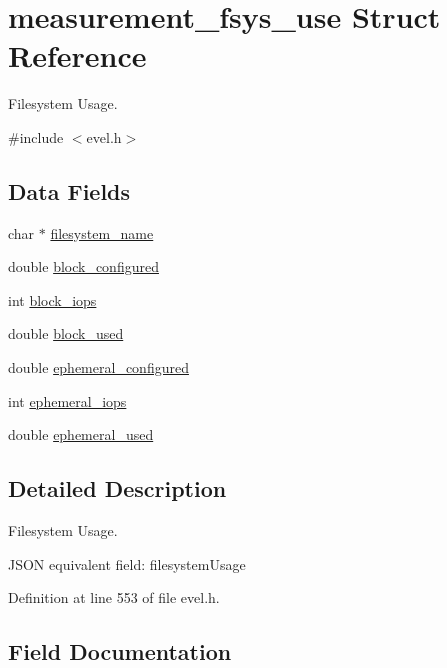 \hypertarget{structmeasurement__fsys__use}{}\section{measurement\+\_\+fsys\+\_\+use Struct Reference}
\label{structmeasurement__fsys__use}


Filesystem Usage.  




{\ttfamily \#include $<$evel.\+h$>$}

\subsection*{Data Fields}
\begin{DoxyCompactItemize}
\item 
char $\ast$ \hyperlink{structmeasurement__fsys__use_aacac02250f665f7b9b6fcf229c842c80}{filesystem\+\_\+name}
\item 
double \hyperlink{structmeasurement__fsys__use_af56164f34467ba0112a396955042fa1c}{block\+\_\+configured}
\item 
int \hyperlink{structmeasurement__fsys__use_ab41ba374abdbd41b71a029e4be061a24}{block\+\_\+iops}
\item 
double \hyperlink{structmeasurement__fsys__use_ad156e14eb4f7f3ab929e4b709aa1ebea}{block\+\_\+used}
\item 
double \hyperlink{structmeasurement__fsys__use_a6cc01785b8eb12d616454fb7070ccaa0}{ephemeral\+\_\+configured}
\item 
int \hyperlink{structmeasurement__fsys__use_a7389ea2d9e7a81e449b77eede1a3c691}{ephemeral\+\_\+iops}
\item 
double \hyperlink{structmeasurement__fsys__use_a5b03b9de4fcc06f38446b20a0a1a6530}{ephemeral\+\_\+used}
\end{DoxyCompactItemize}


\subsection{Detailed Description}
Filesystem Usage. 

J\+S\+ON equivalent field\+: filesystem\+Usage 

Definition at line 553 of file evel.\+h.



\subsection{Field Documentation}
\hypertarget{structmeasurement__fsys__use_af56164f34467ba0112a396955042fa1c}{}\label{structmeasurement__fsys__use_af56164f34467ba0112a396955042fa1c} 
